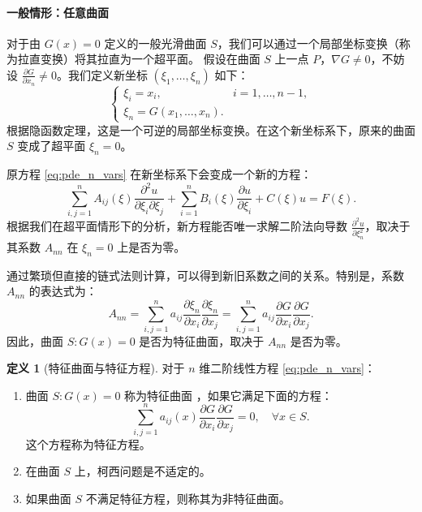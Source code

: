 \documentclass[12pt,a4paper]{article}
\numberwithin{subsection}{section}
\numberwithin{subsubsection}{subsection}
\theoremstyle{plain}
\theoremstyle{definition}
\newtheorem{definition}[theorem]{定义}
\theoremstyle{remark}
\begin{document}
	\paragraph{一般情形：任意曲面}
	对于由 \(G(x)=0\) 定义的一般光滑曲面 \(S\)，我们可以通过一个局部坐标变换（称为拉直变换）将其拉直为一个超平面。
	假设在曲面 \(S\) 上一点 \(P\)，\(\nabla G \neq 0\)，不妨设 \(\frac{\partial G}{\partial x_n} \neq 0\)。我们定义新坐标 \((\xi_1, \dots, \xi_n)\) 如下：
	\begin{equation}
		\begin{cases}
			\xi_i = x_i, & i=1, \dots, n-1, \\
			\xi_n = G(x_1, \dots, x_n).
		\end{cases}
	\end{equation}
	根据隐函数定理，这是一个可逆的局部坐标变换。在这个新坐标系下，原来的曲面 \(S\) 变成了超平面 \(\xi_n = 0\)。
	
	原方程 \eqref{eq:pde_n_vars} 在新坐标系下会变成一个新的方程：
	\[
	\sum_{i,j=1}^{n} A_{ij}(\xi) \frac{\partial^2 u}{\partial \xi_i \partial \xi_j} + \sum_{i=1}^{n} B_i(\xi) \frac{\partial u}{\partial \xi_i} + C(\xi) u = F(\xi).
	\]
	根据我们在超平面情形下的分析，新方程能否唯一求解二阶法向导数 \(\frac{\partial^2 u}{\partial \xi_n^2}\)，取决于其系数 \(A_{nn}\) 在 \(\xi_n=0\) 上是否为零。
	
	通过繁琐但直接的链式法则计算，可以得到新旧系数之间的关系。特别是，系数 \(A_{nn}\) 的表达式为：
	\[
	A_{nn} = \sum_{i,j=1}^{n} a_{ij} \frac{\partial \xi_n}{\partial x_i} \frac{\partial \xi_n}{\partial x_j} = \sum_{i,j=1}^{n} a_{ij} \frac{\partial G}{\partial x_i} \frac{\partial G}{\partial x_j}.
	\]
	因此，曲面 \(S: G(x)=0\) 是否为特征曲面，取决于 \(A_{nn}\) 是否为零。
	
	\begin{definition}[特征曲面与特征方程]
		对于 \(n\) 维二阶线性方程 \eqref{eq:pde_n_vars}：
		\begin{enumerate}[label=(\roman*)]
			\item 曲面 \(S: G(x)=0\) 称为特征曲面 ，如果它满足下面的方程：
			\begin{equation}\label{eq:char_surface_n_dim}
				\sum_{i,j=1}^{n} a_{ij}(x) \frac{\partial G}{\partial x_i} \frac{\partial G}{\partial x_j} = 0, \quad \forall x \in S.
			\end{equation}
			这个方程称为特征方程。
			\item 在曲面 \(S\) 上，柯西问题是不适定的。
			\item 如果曲面 \(S\) 不满足特征方程，则称其为非特征曲面。
		\end{enumerate}
	\end{definition}
	
\end{document}
